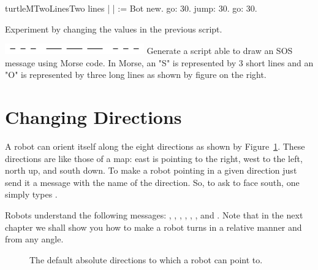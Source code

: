 \begin{scriptfig}{turtleMTwoLines}{Two lines}\label{scr:twoLines}
| \caro | 
\caro := Bot new.
\caro go: 30.
\caro jump: 30.
\caro go: 30.
\end{scriptfig}

\begin{exonofig}
Experiment by changing the values in the previous script. 
\end{exonofig}

\begin{exofigwithsize}[0.5]{\includegraphics[width=6cm]{turtleMSosLines}}\label{exo:sosLines} 
Generate a script able to draw an SOS message using Morse code.  In
Morse, an "S" is represented by 3 short lines and an "O" is
represented by three long lines as shown by figure on the right.
\end{exofigwithsize}



\section{Changing Directions}
A robot can orient itself along the eight directions as shown by Figure~\ref{fig:roseDesVents}. These directions are like those of a map: east is pointing to the right, west to the left, north up, and south down. To make a robot pointing in a given direction just send it a message with the name of the direction.  So, to ask \caro to face south, one simply types . 

Robots understand  the following messages: , , , , , ,  and . Note that in the next chapter we shall show you how to make a robot turns in a relative manner and from any angle. 

\begin{figure}
\caption{The default absolute directions to which a robot can point to.\label{fig:roseDesVents}}
\end{figure}


